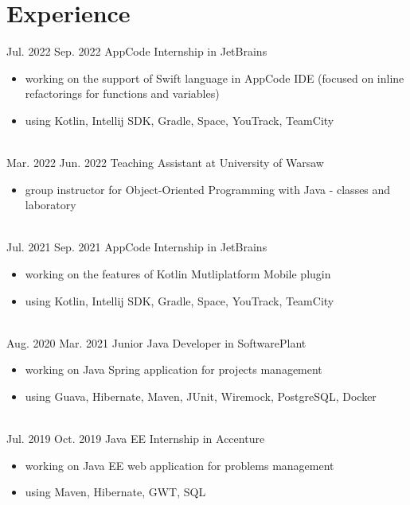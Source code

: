 \documentclass[a4paper]{twentysecondcv} %
\begin{document}
    \makeprofile %

    \vspace{-0.3cm}


    \section{Experience}
    \begin{twenty}
        \twentyitem
        {Jul. 2022}
        {Sep. 2022}
        {AppCode Internship in JetBrains}
        {}
        {}
        {\begin{itemize}
             \item working on the support of Swift language in AppCode IDE (focused on inline refactorings for functions and variables)
             \item using Kotlin, Intellij SDK, Gradle, Space, YouTrack, TeamCity
        \end{itemize}
        }
        \\
        \twentyitem
        {Mar. 2022}
        {Jun. 2022}
        {Teaching Assistant at University of Warsaw}
        {}
        {}
        {\begin{itemize}
             \item group instructor for Object-Oriented Programming with Java - classes and laboratory
        \end{itemize}
        }
        \\
        \twentyitem
        {Jul. 2021}
        {Sep. 2021}
        {AppCode Internship in JetBrains}
        {}
        {}
        {\begin{itemize}
             \item working on the features of Kotlin Mutliplatform Mobile plugin
             \item using Kotlin, Intellij SDK, Gradle, Space, YouTrack, TeamCity
        \end{itemize}
        }
        \\
        \twentyitem
        {Aug. 2020}
        {Mar. 2021}
        {Junior Java Developer in SoftwarePlant}
        {}
        {}
        {\begin{itemize}
             \item working on Java Spring application for projects management
             \item using Guava, Hibernate, Maven, JUnit, Wiremock, PostgreSQL, Docker
        \end{itemize}
        }
        \\
        \twentyitem
        {Jul. 2019}
        {Oct. 2019}
        {Java EE Internship in Accenture}
        {}
        {}
        {\begin{itemize}
             \item working on Java EE web application for problems management
             \item using Maven, Hibernate, GWT, SQL
        \end{itemize}
        }
        \\

    \end{twenty}
\end{document}
